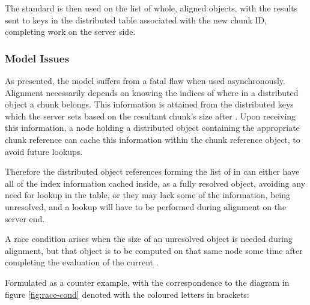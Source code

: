 The standard  is then used on the list of whole,
aligned objects, with the results sent to keys in the distributed table
associated with the new chunk ID, completing work on the server side.

\subsubsection{Model Issues}

As presented, the model suffers from a fatal flaw when used asynchronously.
Alignment necessarily depends on knowing the indices of where in a distributed
object a chunk belongs.
This information is attained from the distributed keys which the server sets
based on the resultant chunk's size after .
Upon receiving this information, a node holding a distributed object containing
the appropriate chunk reference can cache this information within the chunk
reference object, to avoid future lookups.

Therefore the distributed object references forming the list of 
in  can either have all of the index
information cached inside, as a fully resolved object, avoiding any need for
lookup in the table, or they may lack some of the information, being
unresolved, and a lookup will have to be performed during alignment on the
server end.

A race condition arises when the size of an unresolved object is needed during
alignment, but that object is to be computed on that same node some time after
completing the evaluation of the current . 


Formulated as a counter example, with the correspondence to the diagram in
figure \cref{fig:race-cond} denoted with the coloured letters in brackets:

